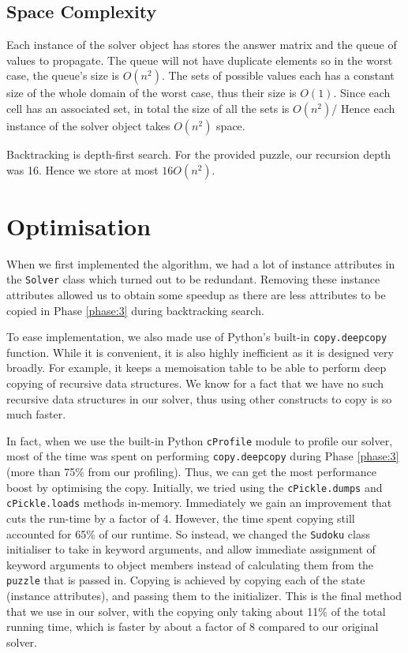 \documentclass[11pt, a4paper]{article}
\begin{document}
\subsection{Space Complexity}
Each instance of the solver object has stores the answer matrix and the queue of values to propagate.
The queue will not have duplicate elements so in the worst case, the queue's size is $O(n^2)$.
The sets of possible values each has a constant size of the whole domain of the worst case, thus their size is $O(1)$.
Since each cell has an associated set, in total the size of all the sets is $O(n^2)$/
Hence each instance of the solver object takes $O(n^2)$ space.

Backtracking is depth-first search.
For the provided puzzle, our recursion depth was 16. Hence we store at most $16O(n^2)$.

\section{Optimisation}
When we first implemented the algorithm, we had a lot of instance attributes in the \texttt{Solver} class which turned out to be redundant.
Removing these instance attributes allowed us to obtain some speedup as there are less attributes to be copied in Phase \ref{phase:3} during backtracking search.

To ease implementation, we also made use of Python's built-in \texttt{copy.deepcopy} function.
While it is convenient, it is also highly inefficient as it is designed very broadly.
For example, it keeps a memoisation table to be able to perform deep copying of recursive data structures.
We know for a fact that we have no such recursive data structures in our solver, thus using other constructs to copy is so much faster.

In fact, when we use the built-in Python \texttt{cProfile} module to profile our solver, most of the time was spent on performing \texttt{copy.deepcopy} during Phase \ref{phase:3} (more than 75\% from our profiling).
Thus, we can get the most performance boost by optimising the copy.
Initially, we tried using the \texttt{cPickle.dumps} and \texttt{cPickle.loads} methods in-memory.
Immediately we gain an improvement that cuts the run-time by a factor of 4.
However, the time spent copying still accounted for 65\% of our runtime.
So instead, we changed the \texttt{Sudoku} class initialiser to take in keyword arguments, and allow immediate assignment of keyword arguments to object members instead of calculating them from the \texttt{puzzle} that is passed in.
Copying is achieved by copying each of the state (instance attributes), and passing them to the initializer.
This is the final method that we use in our solver, with the copying only taking about 11\% of the total running time, which is faster by about a factor of 8 compared to our original solver.
\end{document}
